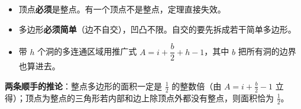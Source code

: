 	\begin{itemize}
		\item 顶点\textbf{必须}是整点。有一个顶点不是整点，定理直接失效。
		\item 多边形\textbf{必须简单}（边不自交），凹凸不限。自交的要先拆成若干简单多边形。
		\item 带 $h$ 个洞的多连通区域用推广式 $A = i + \dfrac{b}{2} + h - 1$，其中 $b$ 把所有洞的边界也算进去。
	\end{itemize}

	\textbf{两条顺手的推论}：整点多边形的面积一定是 $\tfrac{1}{2}$ 的整数倍（由 $A = i + \tfrac{b}{2} - 1$ 立得）；顶点为整点的三角形若内部和边上除顶点外都没有整点，则面积恰为 $\tfrac{1}{2}$。

	\newpage
